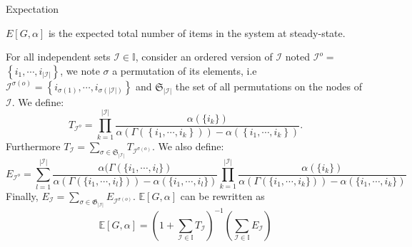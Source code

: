 \documentclass[12pt,aspectratio=1610]{beamer}
\begin{document}
\begin{frame}{Expectation}
	
{\color{blue}\small $E[G,\alpha]$ is the expected total number of items in the system at steady-state.} 
	
For all independent sets $\mathcal{I} \in \mathbb{I}$, consider an ordered version of $\mathcal{I}$ noted $\mathcal{I}^o=$ $\left\{i_1, \cdots, i_{|\mathcal{I}|}\right\}$, we note $\sigma$ a permutation of its elements, i.e $\mathcal{I}^{\sigma(o)}=\left\{i_{\sigma(1)}, \cdots, i_{\sigma(|\mathcal{I}|)}\right\}$ and $\mathfrak{S}_{|\mathcal{I}|}$ the set of all permutations on the nodes of $\mathcal{I}$. We define:
\[
T_{\mathcal{I}^o}=\prod_{k=1}^{|\mathcal{I}|} 
\frac{\alpha(\{i_k\})}
{ \alpha(\Gamma (\left\{i_1, \cdots, i_k\right\}))
-\alpha(\left\{i_1, \cdots, i_k\right\})}.
\]
Furthermore $T_{\mathcal{I}}=\sum_{\sigma \in \mathfrak{S}_{|\mathcal{I}|}} T_{\mathcal{I}^{\sigma(o)}}$.
We also define: 
\[
E_{\mathcal{I}^o}=\sum_{l=1}^{|\mathcal{I}|} 
\frac{\alpha(\Gamma(\{i_1, \cdots, i_l\})}{ \alpha(\Gamma( \{ i_1, \cdots, i_l \})) -\alpha(\{i_1, \cdots, i_l\})} \prod_{k=1}^{|\mathcal{I}|} \frac{\alpha(\{i_k\})}
{ \alpha(\Gamma( \{ i_1, \cdots, i_k \})) -\alpha(\{i_1, \cdots, i_k\})}
\]
Finally,  $E_{\mathcal{I}}=\sum_{\sigma \in \mathfrak{G}_{|\mathcal{I}|}} E_{\mathcal{I}^{\sigma(o)}}$. 
$\mathbb{E}[G, \alpha ]$  can be rewritten as 
\begin{equation}\label{eq:exceptio}
\mathbb{E}[G,\alpha]=\left(1+\sum_{\mathcal{I} \in \mathbb{I}}T_{\mathcal{I}}\right)^{-1}\left(\sum_{\mathcal{I}\in \mathbb{I}} E_{\mathcal{I}}\right)
\end{equation}
\end{frame}
\end{document}
